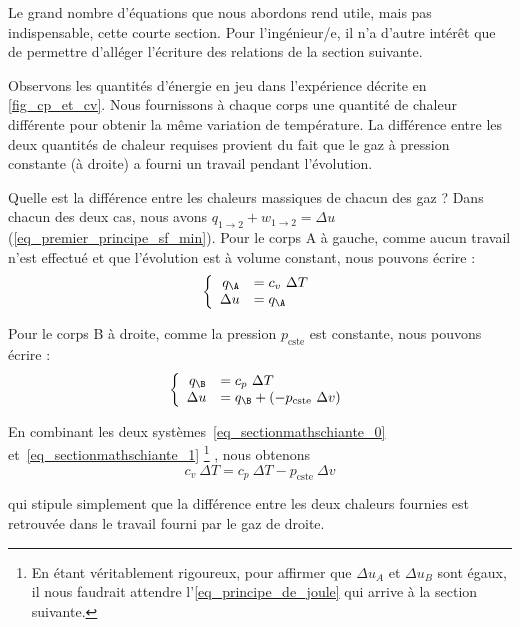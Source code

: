 		Le grand nombre d’équations que nous abordons rend utile, mais pas indispensable, cette courte section. Pour l’ingénieur/e, il n’a d’autre intérêt que de permettre d’alléger l’écriture des relations de la section suivante.

		Observons les quantités d’énergie en jeu dans l’expérience décrite en \cref{fig_cp_et_cv}. Nous fournissons à chaque corps une quantité de chaleur différente pour obtenir la même variation de température. La différence entre les deux quantités de chaleur requises provient du fait que le gaz à pression constante (à droite) a fourni un travail pendant l’évolution.

		Quelle est la différence entre les chaleurs massiques de chacun des gaz ? Dans chacun des deux cas, nous avons $q_{1 \to 2} + w_{1 \to 2} = \Delta u$ (\ref{eq_premier_principe_sf_min}). Pour le corps A à gauche, comme aucun travail n’est effectué et que l’évolution est à volume constant, nous pouvons écrire :
			\begin{equation}
				\left\{
					\begin{array}{rl}
						q_\A 		& = c_v \ \Delta T \\
						\Delta u 			& = q_\A 
					\end{array} \right.
			\label{eq_sectionmathschiante_0}
			\end{equation}

		Pour le corps B à droite, comme la pression $p_\text{cste}$ est constante, nous pouvons écrire :
			\begin{equation}
				\left\{
					\begin{array}{rl}
						q_\B 		& = c_p \ \Delta T \\
						\Delta u 	& = q_\B + (-p_\text{cste} \ \Delta v)
					\end{array} \right.
			\label{eq_sectionmathschiante_1}
			\end{equation}


		En combinant les deux systèmes~\ref{eq_sectionmathschiante_0} et~\ref{eq_sectionmathschiante_1}%
			\footnote{En étant véritablement rigoureux, pour affirmer que $\Delta u_A$ et  $\Delta u_B$ sont égaux, il nous faudrait attendre l’\cref{eq_principe_de_joule} qui arrive à la section suivante.}%
		, nous obtenons
		\begin{equation}
			c_v \ \Delta T = c_p \ \Delta T - p_\text{cste} \ \Delta v
		\end{equation}

		qui stipule simplement que la différence entre les deux chaleurs fournies est retrouvée dans le travail fourni par le gaz de droite.

